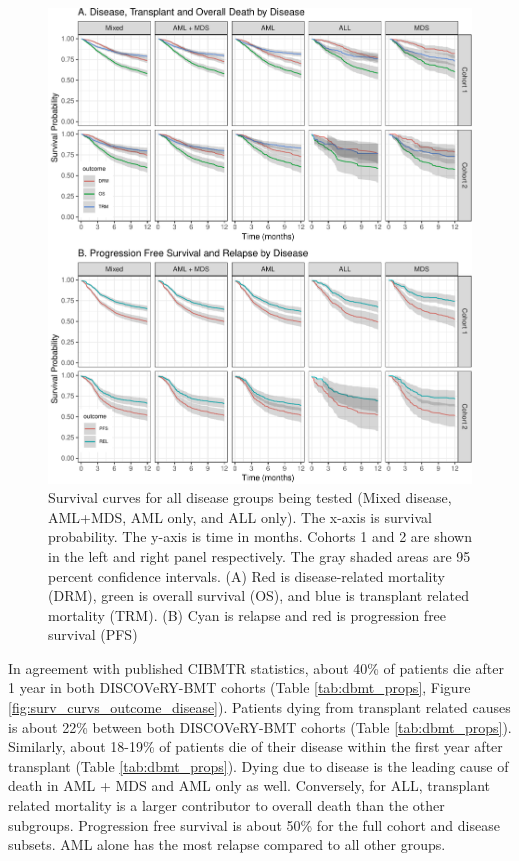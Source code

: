 \documentclass[]{DissertateOSU}
\begin{document}
\begin{figure}

\includegraphics{figures/unnamed-chunk-15-1} \hfill{}

\caption{\label{fig:surv_curvs_outcome_disease} Survival curves for all disease groups being tested (Mixed disease, AML+MDS, AML only, and ALL only). The x-axis is survival probability. The y-axis is time in months. Cohorts 1 and 2 are shown in the left and right panel respectively. The gray shaded areas are 95 percent confidence intervals. (A) Red is disease-related mortality (DRM), green is overall survival (OS), and blue is transplant related mortality (TRM). (B) Cyan is relapse and red is progression free survival (PFS)}\label{fig:unnamed-chunk-15}
\end{figure}

In agreement with published CIBMTR statistics, about 40\% of patients
die after 1 year in both DISCOVeRY-BMT cohorts (Table
\ref{tab:dbmt_props}, Figure \ref{fig:surv_curvs_outcome_disease}).
Patients dying from transplant related causes is about 22\% between both
DISCOVeRY-BMT cohorts (Table \ref{tab:dbmt_props}). Similarly, about
18-19\% of patients die of their disease within the first year after
transplant (Table \ref{tab:dbmt_props}). Dying due to disease is the
leading cause of death in AML + MDS and AML only as well. Conversely,
for ALL, transplant related mortality is a larger contributor to overall
death than the other subgroups. Progression free survival is about 50\%
for the full cohort and disease subsets. AML alone has the most relapse
compared to all other groups.
\end{document}
